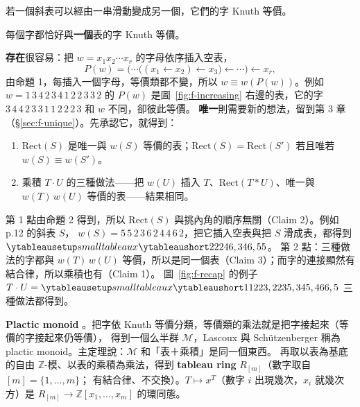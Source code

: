 \begin{thmbox}[命題 2 \fulref{p.22}]
若一個斜表可以經由一串滑動變成另一個，它們的字 Knuth 等價。
\end{thmbox}

\begin{thmbox}
每個字都恰好與\textbf{一個}表的字 Knuth 等價。
\end{thmbox}

\textbf{存在}很容易：把 $w=x_1x_2\cdots x_r$ 的字母依序插入空表，
\[
P(w)=\bigl(\cdots\bigl((x_1\leftarrow x_2)\leftarrow x_3\bigr)\leftarrow\cdots\bigr)\leftarrow x_r ,
\]
由命題 1，每插入一個字母，等價類都不變，所以 $w\equiv w(P(w))$。例如 $w=1\,3\,4\,2\,3\,4\,1\,2\,2\,3\,3\,2$ 的
$P(w)$ 是圖~\ref{fig:f-increasing} 右邊的表，它的字 $3\,4\,4\,2\,3\,3\,1\,1\,2\,2\,2\,3$ 和 $w$ 不同，卻彼此等價。
\textbf{唯一}則需要新的想法，留到第 3 章（\S\ref{sec:f-unique}）。先承認它，就得到：

\begin{thmbox}[推論 \fulref{p.23}]
\begin{enumerate}[nosep]
\item $\mathrm{Rect}(S)$ 是唯一與 $w(S)$ 等價的表；$\mathrm{Rect}(S)=\mathrm{Rect}(S')$ 若且唯若 $w(S)\equiv w(S')$。
\item 乘積 $T\cdot U$ 的三種做法——把 $w(U)$ 插入 $T$、$\mathrm{Rect}(T*U)$、唯一與 $w(T)\,w(U)$ 等價的表——結果相同。
\end{enumerate}
\end{thmbox}

第 1 點由命題 2 得到，所以 $\mathrm{Rect}(S)$ 與挑內角的順序無關（Claim 2）。例如 p.12 的斜表 $S$，
$w(S)=5\,5\,2\,3\,6\,2\,4\,4\,6\,2$，把它插入空表與把 $S$ 滑成表，都得到 $\yts{22246,346,55}$。
第 2 點：三種做法的字都與 $w(T)\,w(U)$ 等價，所以是同一個表（Claim 3）；而字的連接顯然有結合律，所以乘積也有（Claim 1）。
圖~\ref{fig:f-recap} 的例子 $T\cdot U=\yts{11223,2235,345,466,5}$ 三種做法都得到。

\textbf{Plactic monoid} 。把字依 Knuth 等價分類，等價類的乘法就是把字接起來（等價的字接起來仍等價），
得到一個么半群 $\mathcal{M}$，Lascoux 與 Schützenberger 稱為 plactic monoid。主定理說：$\mathcal{M}$ 和「表＋乘積」是同一個東西。
再取以表為基底的自由 $\mathbb{Z}$-模、以表的乘積為乘法，得到 \textbf{tableau ring} $R_{[m]}$（數字取自 $[m]=\{1,\ldots,m\}$；
有結合律、不交換）。$T\mapsto x^T$（數字 $i$ 出現幾次，$x_i$ 就幾次方）是 $R_{[m]}\to\mathbb{Z}[x_1,\ldots,x_m]$ 的環同態。

